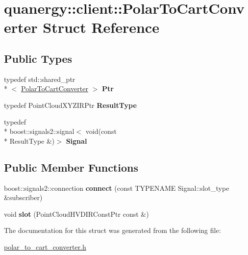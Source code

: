 \hypertarget{structquanergy_1_1client_1_1PolarToCartConverter}{\section{quanergy\-:\-:client\-:\-:Polar\-To\-Cart\-Converter Struct Reference}
\label{structquanergy_1_1client_1_1PolarToCartConverter}
}
\subsection*{Public Types}
\begin{DoxyCompactItemize}
\item 
\hypertarget{structquanergy_1_1client_1_1PolarToCartConverter_ab948183d78b63eda2db0f271f1770a4a}{typedef std\-::shared\-\_\-ptr\\*
$<$ \hyperlink{structquanergy_1_1client_1_1PolarToCartConverter}{Polar\-To\-Cart\-Converter} $>$ {\bfseries Ptr}}\label{structquanergy_1_1client_1_1PolarToCartConverter_ab948183d78b63eda2db0f271f1770a4a}

\item 
\hypertarget{structquanergy_1_1client_1_1PolarToCartConverter_a3b448df71d623646340e0e96fd24aed4}{typedef Point\-Cloud\-X\-Y\-Z\-I\-R\-Ptr {\bfseries Result\-Type}}\label{structquanergy_1_1client_1_1PolarToCartConverter_a3b448df71d623646340e0e96fd24aed4}

\item 
\hypertarget{structquanergy_1_1client_1_1PolarToCartConverter_ab54ab12f4c6d1741abe111dd8aa0c50e}{typedef \\*
boost\-::signals2\-::signal$<$ void(const \\*
Result\-Type \&)$>$ {\bfseries Signal}}\label{structquanergy_1_1client_1_1PolarToCartConverter_ab54ab12f4c6d1741abe111dd8aa0c50e}

\end{DoxyCompactItemize}
\subsection*{Public Member Functions}
\begin{DoxyCompactItemize}
\item 
\hypertarget{structquanergy_1_1client_1_1PolarToCartConverter_a4499d399c420e3170e564033946c507f}{boost\-::signals2\-::connection {\bfseries connect} (const T\-Y\-P\-E\-N\-A\-M\-E Signal\-::slot\-\_\-type \&subscriber)}\label{structquanergy_1_1client_1_1PolarToCartConverter_a4499d399c420e3170e564033946c507f}

\item 
\hypertarget{structquanergy_1_1client_1_1PolarToCartConverter_aab349ed84215a20e776c659e4db7feb5}{void {\bfseries slot} (Point\-Cloud\-H\-V\-D\-I\-R\-Const\-Ptr const \&)}\label{structquanergy_1_1client_1_1PolarToCartConverter_aab349ed84215a20e776c659e4db7feb5}

\end{DoxyCompactItemize}


The documentation for this struct was generated from the following file\-:\begin{DoxyCompactItemize}
\item 
\hyperlink{polar__to__cart__converter_8h}{polar\-\_\-to\-\_\-cart\-\_\-converter.\-h}\end{DoxyCompactItemize}
